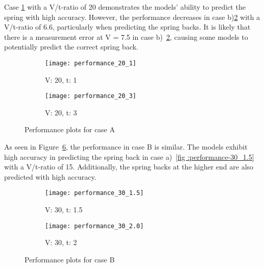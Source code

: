 Case \ref{fig:performance-20-1} with a V/t-ratio of 20 demonstrates the models'
ability to predict the spring with high accuracy.
However, the performance decreases in case b)\ref{fig:performance-20-3} with a V/t-ratio
of 6.6, particularly when predicting the spring backs.
It is likely that there is a measurement error at V = 7.5 in case
b)~\ref{fig:performance-20-3}, causing some models to potentially predict the correct
spring back.

\begin{figure}[H]
    \begin{tcolorbox}[arc=0pt,boxrule=0.5pt]
        \begin{subfigure}{0.5\textwidth}
            \texttt{[image: performance\_20\_1]}
            \caption{V: 20, t: 1}
            \label{fig:performance-20-1}
        \end{subfigure}
        \hfill
        \begin{subfigure}{0.5\textwidth}
            \texttt{[image: performance\_20\_3]}
            \caption{V: 20, t: 3}
            \label{fig:performance-20-3}
        \end{subfigure}
    \end{tcolorbox}
    \label{fig:performance-case-a}
    \caption{Performance plots for case A}
\end{figure}

As seen in Figure~\ref{fig:performance-case-b}, the performance in case B is similar.
The models exhibit high accuracy in predicting the spring back in case a)~\ref{fig
:performance-30_1.5} with a V/t-ratio of 15. Additionally, the spring backs at the
higher end are also predicted with high accuracy.

\begin{figure}[H]
    \begin{tcolorbox}[arc=0pt,boxrule=0.5pt]
        \begin{subfigure}{0.5\textwidth}
            \texttt{[image: performance\_30\_1.5]}
            \caption{V: 30, t: 1.5}
            \label{fig:performance-30_1.5}
        \end{subfigure}
        \hfill
        \begin{subfigure}{0.5\textwidth}
            \texttt{[image: performance\_30\_2.0]}
            \caption{V: 30, t: 2}
            \label{fig:performance-30_2.0}
        \end{subfigure}
    \end{tcolorbox}
    \caption{Performance plots for case B}
    \label{fig:performance-case-b}
\end{figure}

